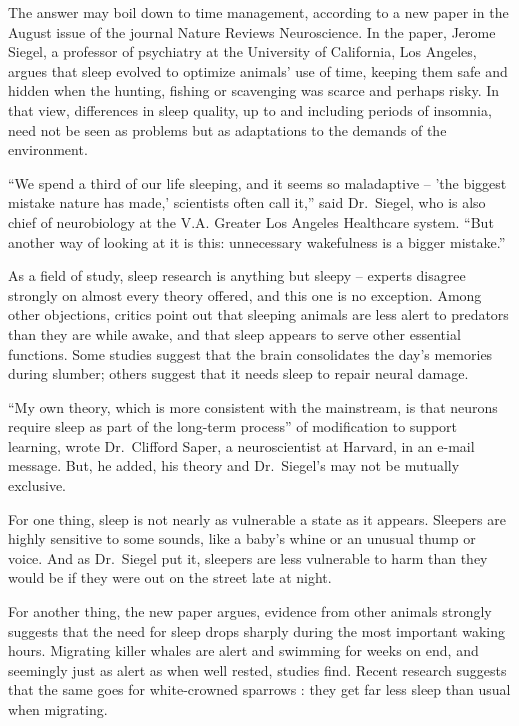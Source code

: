 ﻿\documentclass[12pt]{article}
\begin{document}
The answer may boil down to time management, according to a new paper in the August issue of the
journal Nature Reviews Neuroscience. In the paper, Jerome Siegel, a professor of psychiatry at the
University of California, Los Angeles, argues that sleep evolved to optimize animals' use of time,
keeping them safe and hidden when the hunting, fishing or scavenging was scarce and perhaps risky.
In that view, differences in sleep quality, up to and including periods of insomnia\cite{insomnia},
need not be seen as problems but as adaptations to the demands of the environment.

``We spend a third of our life sleeping, and it seems so maladaptive\cite{maladaptive} -- 'the
biggest mistake nature has made,' scientists often call it,'' said Dr.~Siegel, who is also chief of
neurobiology at the V.A. Greater Los Angeles Healthcare system. ``But another way of looking at it
is this: unnecessary wakefulness is a bigger mistake.''

As a field of study, sleep research is anything but sleepy -- experts disagree strongly on almost
every theory offered, and this one is no exception. Among other objections, critics point out that
sleeping animals are less alert to predators\cite{predator} than they are while awake, and that
sleep appears to serve other essential functions. Some studies suggest that the brain consolidates
the day's memories during slumber; others suggest that it needs sleep to repair neural damage.

``My own theory, which is more consistent with the mainstream, is that neurons require sleep as part
of the long-term process'' of modification to support learning, wrote Dr.~Clifford Saper, a
neuroscientist at Harvard, in an e-mail message. But, he added, his theory and Dr.~Siegel's may not
be mutually exclusive.

For one thing, sleep is not nearly as vulnerable a state as it appears. Sleepers are highly
sensitive to some sounds, like a baby's whine or an unusual thump or voice. And as Dr.~Siegel put
it, sleepers are less vulnerable to harm than they would be if they were out on the street late at
night.

For another thing, the new paper argues, evidence from other animals strongly suggests that the need
for sleep drops sharply during the most important waking hours. Migrating\cite{migrate} killer
whales are alert and swimming for weeks on end, and seemingly just as alert as when well rested,
studies find. Recent research suggests that the same goes for white-crowned sparrows : they get far
less sleep than usual when migrating.
\end{document}

